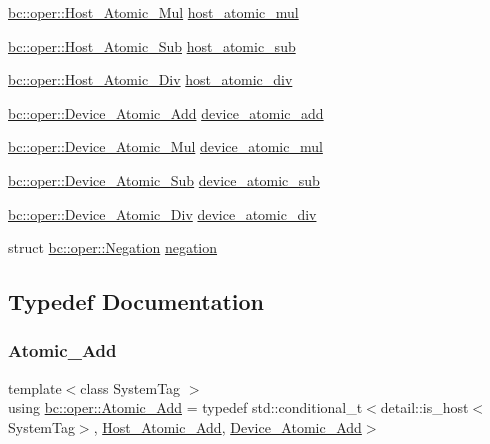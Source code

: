\begin{DoxyCompactItemize}
\hyperlink{structbc_1_1oper_1_1Host__Atomic__Mul}{bc\+::oper\+::\+Host\+\_\+\+Atomic\+\_\+\+Mul} \hyperlink{namespacebc_1_1oper_a4e6bd126cfaa0f0dce337ec491be102c}{host\+\_\+atomic\+\_\+mul}
\item 
\hyperlink{structbc_1_1oper_1_1Host__Atomic__Sub}{bc\+::oper\+::\+Host\+\_\+\+Atomic\+\_\+\+Sub} \hyperlink{namespacebc_1_1oper_a56dfde445385bd8b21aeded666ead99e}{host\+\_\+atomic\+\_\+sub}
\item 
\hyperlink{structbc_1_1oper_1_1Host__Atomic__Div}{bc\+::oper\+::\+Host\+\_\+\+Atomic\+\_\+\+Div} \hyperlink{namespacebc_1_1oper_ac6138d1f1ea5b3ab813728c0cb9e5a22}{host\+\_\+atomic\+\_\+div}
\item 
\hyperlink{structbc_1_1oper_1_1Device__Atomic__Add}{bc\+::oper\+::\+Device\+\_\+\+Atomic\+\_\+\+Add} \hyperlink{namespacebc_1_1oper_aafd9108f735dbf10d6c0ab179eba26ad}{device\+\_\+atomic\+\_\+add}
\item 
\hyperlink{structbc_1_1oper_1_1Device__Atomic__Mul}{bc\+::oper\+::\+Device\+\_\+\+Atomic\+\_\+\+Mul} \hyperlink{namespacebc_1_1oper_a645f972d17fac4c9a269a9cfb0dd28b9}{device\+\_\+atomic\+\_\+mul}
\item 
\hyperlink{structbc_1_1oper_1_1Device__Atomic__Sub}{bc\+::oper\+::\+Device\+\_\+\+Atomic\+\_\+\+Sub} \hyperlink{namespacebc_1_1oper_a71459ca0994a71749da5172e9fbf11e1}{device\+\_\+atomic\+\_\+sub}
\item 
\hyperlink{structbc_1_1oper_1_1Device__Atomic__Div}{bc\+::oper\+::\+Device\+\_\+\+Atomic\+\_\+\+Div} \hyperlink{namespacebc_1_1oper_ac131a45947dab375e9d6a608986b13f5}{device\+\_\+atomic\+\_\+div}
\item 
struct \hyperlink{structbc_1_1oper_1_1Negation}{bc\+::oper\+::\+Negation} \hyperlink{namespacebc_1_1oper_a8e9e58a0be7c3532bf1a6476308e53ea}{negation}
\end{DoxyCompactItemize}


\subsection{Typedef Documentation}
\mbox{\label{namespacebc_1_1oper_acbaeedfea4454f26a03fa796f5695f1e}} 
\subsubsection{\texorpdfstring{Atomic\+\_\+\+Add}{Atomic\_Add}}
{\footnotesize\ttfamily template$<$class System\+Tag $>$ \\
using \hyperlink{namespacebc_1_1oper_acbaeedfea4454f26a03fa796f5695f1e}{bc\+::oper\+::\+Atomic\+\_\+\+Add} = typedef std\+::conditional\+\_\+t$<$detail\+::is\+\_\+host$<$System\+Tag$>$, \hyperlink{structbc_1_1oper_1_1Host__Atomic__Add}{Host\+\_\+\+Atomic\+\_\+\+Add}, \hyperlink{structbc_1_1oper_1_1Device__Atomic__Add}{Device\+\_\+\+Atomic\+\_\+\+Add}$>$}

